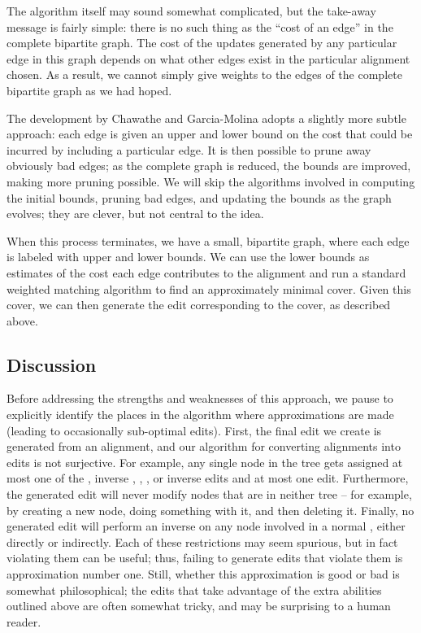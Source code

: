 \documentclass{article}
\begin{document}

The algorithm itself may sound somewhat complicated, but the take-away
message is fairly simple: there is no such thing as the ``cost of an edge''
in the complete bipartite graph. The cost of the updates generated by any
particular edge in this graph depends on what other edges exist in the
particular alignment chosen. As a result, we cannot simply give weights to
the edges of the complete bipartite graph as we had hoped.

The development by Chawathe and Garcia-Molina adopts a slightly more subtle
approach: each edge is given an upper and lower bound on the cost that could
be incurred by including a particular edge. It is then possible to prune
away obviously bad edges; as the complete graph is reduced, the bounds are
improved, making more pruning possible. We will skip the algorithms involved
in computing the initial bounds, pruning bad edges, and updating the bounds
as the graph evolves; they are clever, but not central to the idea.

When this process terminates, we have a small, bipartite graph, where each
edge is labeled with upper and lower bounds. We can use the lower bounds as
estimates of the cost each edge contributes to the alignment and run a
standard weighted matching algorithm to find an approximately minimal cover.
Given this cover, we can then generate the edit corresponding to the cover,
as described above.

\subsection{Discussion}
Before addressing the strengths and weaknesses of this approach, we pause to
explicitly identify the places in the algorithm where approximations are
made (leading to occasionally sub-optimal edits). First, the final edit we
create is generated from an alignment, and our algorithm for converting
alignments into edits is not surjective. For example, any single node in the
tree gets assigned at most one of the \einsert, inverse \einsert, \emove,
\ecopy, or inverse \ecopy edits and at most one \eupdate edit. Furthermore,
the generated edit will never modify nodes that are in neither tree -- for
example, by creating a new node, doing something with it, and then deleting
it. Finally, no generated edit will perform an inverse \ecopy on any node
involved in a normal \ecopy, either directly or indirectly. Each of these
restrictions may seem spurious, but in fact violating them can be useful;
thus, failing to generate edits that violate them is approximation number
one.  Still, whether this approximation is good or bad is somewhat
philosophical; the edits that take advantage of the extra abilities outlined
above are often somewhat tricky, and may be surprising to a human reader.
\end{document}
